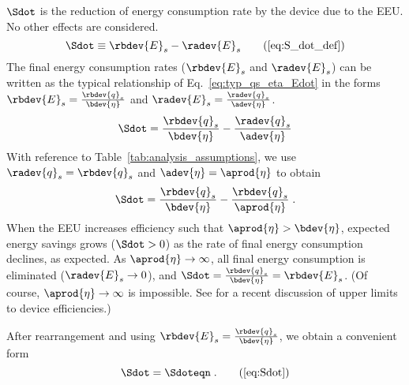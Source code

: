 $\Sdot$ is the reduction of energy consumption rate
by the device due to the EEU.
No other effects are considered.
%
\begin{equation}
  \Sdot \equiv \rbdev{E}_s - \radev{E}_s  \tag{\ref{eq:S_dot_def}}
\end{equation}
%
The final energy consumption rates ($\rbdev{E}_s$ and $\radev{E}_s$) 
can be written as the typical relationship of Eq.~\ref{eq:typ_qs_eta_Edot} in the forms
$\rbdev{E}_s = \frac{\rbdev{q}_s}{\bdev{\eta}}$ and 
$\radev{E}_s = \frac{\radev{q}_s}{\adev{\eta}}$. 
%
\begin{equation}
  \Sdot = \frac{\rbdev{q}_s}{\bdev{\eta}} - \frac{\radev{q}_s}{\adev{\eta}}
\end{equation}
%
With reference to Table~\ref{tab:analysis_assumptions}, 
we use $\radev{q}_s = \rbdev{q}_s$ and $\adev{\eta} = \aprod{\eta}$ to obtain
%
\begin{equation}
  \Sdot = \frac{\rbdev{q}_s}{\bdev{\eta}} - \frac{\rbdev{q}_s}{\aprod{\eta}} \; .
\end{equation}
%
When the EEU increases efficiency such that $\aprod{\eta} > \bdev{\eta}$,
expected energy savings grows ($\Sdot > 0$)
as the rate of final energy consumption declines,
as expected.
As $\aprod{\eta} \rightarrow \infty$,
all final energy consumption is eliminated ($\radev{E}_s \rightarrow 0$), and
$\Sdot = \frac{\rbdev{q}_s}{\bdev{\eta}} = \rbdev{E}_s$.
(Of course, $\aprod{\eta} \rightarrow \infty$ is impossible. 
See \citet{Paoli:2020aa} for a recent discussion of upper limits to device efficiencies.)

After rearrangement and using $\rbdev{E}_s = \frac{\rbdev{q}_s}{\bdev{\eta}}$, 
we obtain a convenient form
%
\begin{equation}
  \Sdot = \Sdoteqn \; .  \tag{\ref{eq:Sdot}}
\end{equation}


% 
% 



